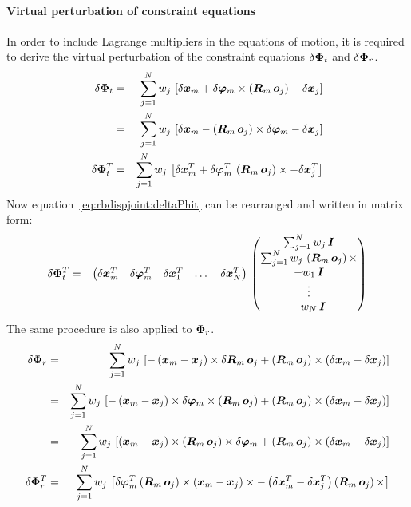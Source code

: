 \paragraph{Virtual perturbation of constraint equations}
In order to include Lagrange multipliers in the equations of motion, it is required to derive the virtual perturbation of the constraint equations $\delta\bm{\Phi}_t$ and $\delta\bm{\Phi}_r$.
\begin{eqnarray}
\delta\bm{\Phi}_t & = & \sum_{j=1}^{N} w_j \, \left[\delta\bm{x}_m + \delta\bm{\varphi}_m \times \left(\bm{R}_m \, \bm{o}_j\right) - \delta\bm{x}_j \right] \\
                 & = & \sum_{j=1}^{N} w_j \, \left[\delta\bm{x}_m - \left(\bm{R}_m \, \bm{o}_j\right) \times \delta\bm{\varphi}_m - \delta\bm{x}_j \right] \\
\delta\bm{\Phi}_t^T & = & \sum_{j=1}^{N} w_j \, \left[\delta\bm{x}_m^T + \delta\bm{\varphi}_m^T \, \left(\bm{R}_m \, \bm{o}_j\right)\times - \delta\bm{x}_j^T \right] \label{eq:rbdispjoint:deltaPhit}
\end{eqnarray}
Now equation~\ref{eq:rbdispjoint:deltaPhit} can be rearranged and written in matrix form:
\begin{eqnarray}
\delta\bm{\Phi}_t^T & = & \begin{pmatrix}
                   \delta\bm{x}_m^T &
                   \delta\bm{\varphi}_m^T &
                   \delta\bm{x}_1^T &
                   \hdots{} &
                   \delta\bm{x}_N^T
                   \end{pmatrix} \,
\begin{pmatrix}
        \sum_{j=1}^N w_j \, \bm{I} \\
        \sum_{j=1}^N w_j \, \left(\bm{R}_m \, \bm{o}_j\right)\times \\
        -w_1 \, \bm{I} \\
        \vdots{} \\
        -w_N \, \bm{I}
\end{pmatrix}
\end{eqnarray}
The same procedure is also applied to $\bm{\Phi}_r$.
\begin{eqnarray}
\delta\bm{\Phi}_r & = & \sum_{j=1}^{N} w_j\,\left[-\left(\bm{x}_m - \bm{x}_j\right) \times \delta\bm{R}_m \, \bm{o}_j + \left(\bm{R}_m\,\bm{o}_j\right)\times\left(\delta\bm{x}_m - \delta\bm{x}_j\right)\right] \\
& = & \sum_{j=1}^{N} w_j \, \left[-\left(\bm{x}_m - \bm{x}_j\right)\times\delta\bm{\varphi}_m\times\left(\bm{R}_m \, \bm{o}_j\right) + \left(\bm{R}_m\,\bm{o}_j\right) \times \left(\delta\bm{x}_m - \delta\bm{x}_j\right)\right] \\
& = & \sum_{j=1}^{N} w_j \, \left[\left(\bm{x}_m - \bm{x}_j\right)\times\left(\bm{R}_m \, \bm{o}_j\right)\times\delta\bm{\varphi}_m + \left(\bm{R}_m\,\bm{o}_j\right) \times \left(\delta\bm{x}_m - \delta\bm{x}_j\right)\right] \\
\delta\bm{\Phi}_r^T & = & \sum_{j=1}^{N} w_j \, \left[\delta\bm{\varphi}_m^T \left(\bm{R}_m \, \bm{o}_j\right)\times\left(\bm{x}_m - \bm{x}_j\right)\times - \left(\delta\bm{x}_m^T - \delta\bm{x}_j^T\right) \left(\bm{R}_m\,\bm{o}_j\right) \times \right] \label{eq:rbdispjoint:deltaPhir}
\end{eqnarray}
